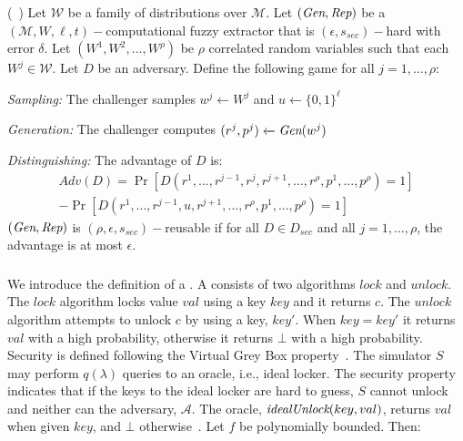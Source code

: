 \begin{definition}{(\rfe~\cite{reusablefe})}\label{def:rfe}
Let $\mathcal{W}$ be a family of distributions over $\mathcal{M}$. Let $(\textit{Gen},\textit{Rep})$ be a $(\mathcal{M},W,\ell,t)-$computational fuzzy extractor that is $(\epsilon,s_{sec})-$hard with error $\delta$. Let $(W^1,W^2,...,W^\rho)$ be $\rho$ correlated random variables such that each $W^j \in \mathcal{W}$. Let $D$ be an adversary. Define the following game for all $j = 1, \dots, \rho$:

\textit{Sampling:} The challenger samples $w^j \xleftarrow{} W^j$ and $u \xleftarrow{} \{0, 1\}^\ell$

\textit{Generation:} The challenger computes $(r^j , p^j ) \xleftarrow{} \textit{Gen}(w^j)$

\textit{Distinguishing:} The advantage of $D$ is:
\begin{align*}
 Adv(D) = \Pr[D(r^1,...,r^{j-1},r^j,r^{j+1},...,r^\rho,p^1,...,p^\rho) = 1]\\ - \Pr[D(r^1, ..., r^{j-1}, u, r^{j+1}, ..., r^\rho, p^1, ..., p^\rho) = 1]
\end{align*}
$(\textit{Gen}, \textit{Rep})$ is $(\rho, \epsilon, s_{sec})-$reusable if for all $D \in D_{sec}$ and all $j = 1, \dots, \rho$, the advantage is at most $\epsilon$.
\end{definition}

\subsubsection*{\dls}
We introduce the definition of a \dl.
A \dl consists of two algorithms $lock$ and $unlock$. The $lock$ algorithm locks value $val$ using a key $key$ and it returns $c$. The $unlock$ algorithm attempts to unlock $c$ by using a key, $key'$. When $key = key'$ it returns $val$ with a high probability, otherwise it returns $\bot$ with a high probability.
Security is defined following the Virtual Grey Box property~\cite{dlsec}. The simulator $S$ may perform $q(\lambda)$ queries to an oracle, i.e., ideal locker. The security property indicates that if the keys to the ideal locker are hard to guess, $S$ cannot unlock and neither can the adversary, $\mathcal{A}$.
The oracle, $\textit{idealUnlock}(key, val)$, returns $val$ when given $key$, and $\bot$ otherwise~\cite{reusablefe,rpi}. Let $f$ be polynomially bounded. Then:

